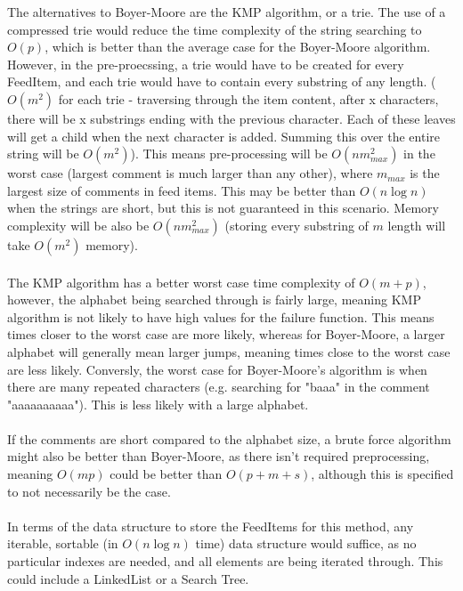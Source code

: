 \documentclass{article}
\begin{document}
	The alternatives to Boyer-Moore are the KMP algorithm, or a trie. The use of a compressed trie would reduce the time complexity of the string searching to $O(p)$, which is better than the average case for the Boyer-Moore algorithm. However, in the pre-proecssing, a trie would have to be created for every FeedItem, and each trie would have to contain every substring of any length. ($O(m^2)$ for each trie - traversing through the item content, after x characters, there will be x substrings ending with the previous character. Each of these leaves will get a child when the next character is added. Summing this over the entire string will be $O(m^2)$). This means pre-processing will be $O(nm_{max}^2)$ in the worst case (largest comment is much larger than any other), where $m_{max}$ is the largest size of comments in feed items. This may be better than $O(n \log n)$ when the strings are short, but this is not guaranteed in this scenario. Memory complexity will be also be $O(nm_{max}^2)$ (storing every substring of $m$ length will take $O(m^2)$ memory). \\ \\
	The KMP algorithm has a better worst case time complexity of $O(m + p)$, however, the alphabet being searched through is fairly large, meaning KMP algorithm is not likely to have high values for the failure function. This means times closer to the worst case are more likely, whereas for Boyer-Moore, a larger alphabet will generally mean larger jumps, meaning times close to the worst case are less likely. Conversly, the worst case for Boyer-Moore's algorithm is when there are many repeated characters (e.g. searching for "baaa" in the comment "aaaaaaaaaa"). This is less likely with a large alphabet. \\ \\
	If the comments are short compared to the alphabet size, a brute force algorithm might also be better than Boyer-Moore, as there isn't required preprocessing, meaning $O(mp)$ could be better than $O(p + m + s)$, although this is specified to not necessarily be the case. \\ \\
	In terms of the data structure to store the FeedItems for this method, any iterable, sortable (in $O(n \log n)$ time) data structure would suffice, as no particular indexes are needed, and all elements are being iterated through. This could include a LinkedList or a Search Tree.
	\\ \\ \\
\end{document}
